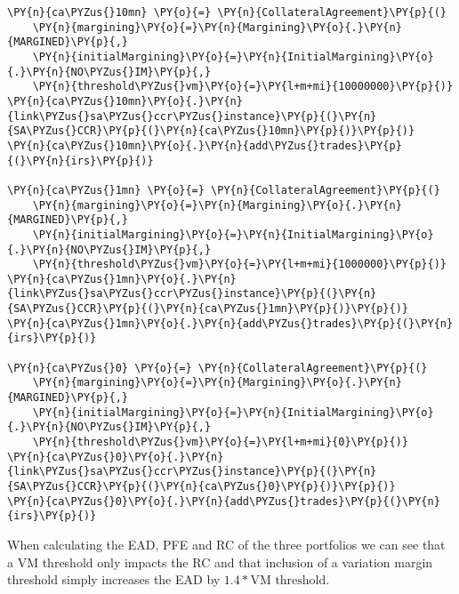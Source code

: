     \begin{tcolorbox}[breakable, size=fbox, boxrule=1pt, pad at break*=1mm,colback=cellbackground, colframe=cellborder]
\begin{Verbatim}[commandchars=\\\{\}]
\PY{n}{ca\PYZus{}10mn} \PY{o}{=} \PY{n}{CollateralAgreement}\PY{p}{(}
    \PY{n}{margining}\PY{o}{=}\PY{n}{Margining}\PY{o}{.}\PY{n}{MARGINED}\PY{p}{,}
    \PY{n}{initialMargining}\PY{o}{=}\PY{n}{InitialMargining}\PY{o}{.}\PY{n}{NO\PYZus{}IM}\PY{p}{,}
    \PY{n}{threshold\PYZus{}vm}\PY{o}{=}\PY{l+m+mi}{10000000}\PY{p}{)}
\PY{n}{ca\PYZus{}10mn}\PY{o}{.}\PY{n}{link\PYZus{}sa\PYZus{}ccr\PYZus{}instance}\PY{p}{(}\PY{n}{SA\PYZus{}CCR}\PY{p}{(}\PY{n}{ca\PYZus{}10mn}\PY{p}{)}\PY{p}{)}
\PY{n}{ca\PYZus{}10mn}\PY{o}{.}\PY{n}{add\PYZus{}trades}\PY{p}{(}\PY{n}{irs}\PY{p}{)}

\PY{n}{ca\PYZus{}1mn} \PY{o}{=} \PY{n}{CollateralAgreement}\PY{p}{(}
    \PY{n}{margining}\PY{o}{=}\PY{n}{Margining}\PY{o}{.}\PY{n}{MARGINED}\PY{p}{,}
    \PY{n}{initialMargining}\PY{o}{=}\PY{n}{InitialMargining}\PY{o}{.}\PY{n}{NO\PYZus{}IM}\PY{p}{,}
    \PY{n}{threshold\PYZus{}vm}\PY{o}{=}\PY{l+m+mi}{1000000}\PY{p}{)}
\PY{n}{ca\PYZus{}1mn}\PY{o}{.}\PY{n}{link\PYZus{}sa\PYZus{}ccr\PYZus{}instance}\PY{p}{(}\PY{n}{SA\PYZus{}CCR}\PY{p}{(}\PY{n}{ca\PYZus{}1mn}\PY{p}{)}\PY{p}{)}
\PY{n}{ca\PYZus{}1mn}\PY{o}{.}\PY{n}{add\PYZus{}trades}\PY{p}{(}\PY{n}{irs}\PY{p}{)}

\PY{n}{ca\PYZus{}0} \PY{o}{=} \PY{n}{CollateralAgreement}\PY{p}{(}
    \PY{n}{margining}\PY{o}{=}\PY{n}{Margining}\PY{o}{.}\PY{n}{MARGINED}\PY{p}{,}
    \PY{n}{initialMargining}\PY{o}{=}\PY{n}{InitialMargining}\PY{o}{.}\PY{n}{NO\PYZus{}IM}\PY{p}{,}
    \PY{n}{threshold\PYZus{}vm}\PY{o}{=}\PY{l+m+mi}{0}\PY{p}{)}
\PY{n}{ca\PYZus{}0}\PY{o}{.}\PY{n}{link\PYZus{}sa\PYZus{}ccr\PYZus{}instance}\PY{p}{(}\PY{n}{SA\PYZus{}CCR}\PY{p}{(}\PY{n}{ca\PYZus{}0}\PY{p}{)}\PY{p}{)}
\PY{n}{ca\PYZus{}0}\PY{o}{.}\PY{n}{add\PYZus{}trades}\PY{p}{(}\PY{n}{irs}\PY{p}{)}
\end{Verbatim}
\end{tcolorbox}

    When calculating the EAD, PFE and RC of the three portfolios we can see
that a VM threshold only impacts the RC and that inclusion of a
variation margin threshold simply increases the EAD by
\(1.4*\text{VM threshold}\).

